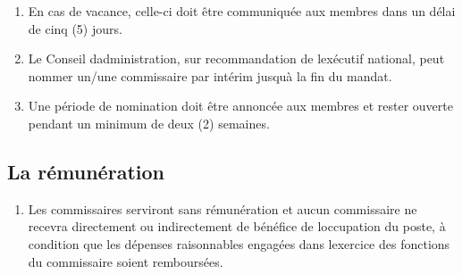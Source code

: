 \begin{enumerate}
 \item
  En cas de vacance, celle-ci doit être communiquée aux membres dans un délai de cinq (5) jours.
 \item
  Le Conseil d\textquotesingle administration, sur recommandation de l\textquotesingle exécutif national, peut nommer un/une commissaire par intérim jusqu\textquotesingle à la fin du mandat.
 \item
  Une période de nomination doit être annoncée aux membres et rester ouverte pendant un minimum de deux (2) semaines.
\end{enumerate}

\subsection{La rémunération}
\label{la-remuneration-3}

\begin{enumerate}
 \item
  Les commissaires serviront sans rémunération et aucun commissaire ne recevra directement ou indirectement de bénéfice de l\textquotesingle occupation du poste, à condition que les dépenses raisonnables engagées dans l\textquotesingle exercice des fonctions du commissaire soient remboursées.
\end{enumerate}

